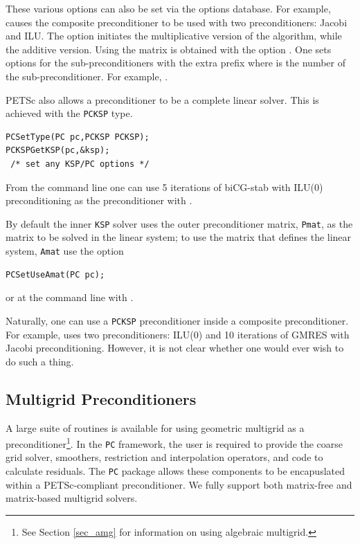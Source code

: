 These various options can also be set via the options database. For example,
    
 causes the composite preconditioner to be used with
two preconditioners: Jacobi and ILU. The option  
 initiates the multiplicative version of the algorithm,
while   the additive version. Using the 
matrix is obtained with the option .
 One sets options for the sub-preconditioners with the
extra prefix  where  is the number of the sub-preconditioner.
For example,  .

PETSc also allows a preconditioner to be a complete linear solver. This is
achieved with the \lstinline{PCKSP} type.
\begin{lstlisting}
PCSetType(PC pc,PCKSP PCKSP);
PCKSPGetKSP(pc,&ksp);
 /* set any KSP/PC options */
\end{lstlisting}
From the command line one can use 5 iterations of
biCG-stab with ILU(0) preconditioning as the preconditioner with
.

By default the inner \lstinline{KSP} solver uses the outer preconditioner matrix, \lstinline{Pmat},
as the matrix to be solved in the linear system; to use the matrix that defines the linear system, \lstinline{Amat} use the
option
\begin{lstlisting}
PCSetUseAmat(PC pc);
\end{lstlisting}
or at the command line with . 

Naturally, one can use a \lstinline{PCKSP} preconditioner inside a composite preconditioner. For example,
uses two preconditioners: ILU(0) and 10 iterations of GMRES with Jacobi preconditioning. 
However, it is not clear whether one would ever wish to do such a thing.

\subsection{Multigrid Preconditioners}  \label{sec_mg}

A large suite of routines is available for using geometric multigrid as a
preconditioner\footnote{See Section \ref{sec_amg} for information on using algebraic multigrid.}. 
In the \lstinline{PC} framework, the user is required to provide
the coarse grid solver, smoothers, restriction and interpolation operators,
and code to calculate residuals. The \lstinline{PC} package
allows these components to be encapuslated within a PETSc-compliant preconditioner.
We fully support both matrix-free and matrix-based multigrid solvers.

